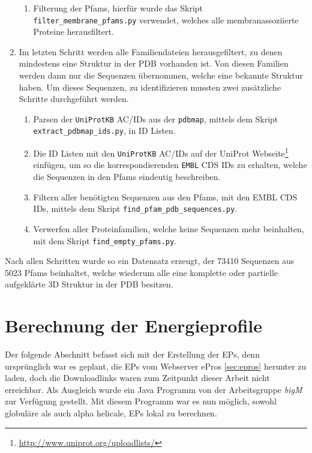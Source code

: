 \begin{enumerate}
\begin{enumerate}
        \item
        Filterung der \ac{Pfams}, hierfür wurde das Skript \texttt{filter\-\_membrane\-\_pfams.py} verwendet, welches alle membranassoziierte Proteine herausfiltert.
    \end{enumerate}
\item
    Im letzten Schritt werden alle Familiendateien herausgefiltert, zu denen mindestens eine Struktur in der \ac{PDB} vorhanden ist. Von diesen Familien werden dann nur die Sequenzen übernommen, welche eine bekannte Struktur haben. Um dieses Sequenzen, zu identifizieren mussten zwei zusätzliche Schritte durchgeführt werden.
    \begin{enumerate}
        \item
        Parsen der \texttt{UniProtKB} AC/IDs aus der \texttt{pdbmap}, mittels dem Skript \texttt{extract\_pdbmap\_ids.py}, in ID Listen.
        \item
        Die ID Listen mit den \texttt{UniProtKB} AC/IDs auf der UniProt Webseite\footnote{\url{http://www.uniprot.org/uploadlists/}} einfügen, um so die korrespondierenden \texttt{EMBL} CDS IDs zu erhalten, welche die Sequenzen in den Pfams eindeutig beschreiben.
        \item
        Filtern aller benötigten Sequenzen aus den Pfams, mit den EMBL CDS IDs, mittels dem Skript \texttt{find\-\_pfam\-\_pdb\-\_sequences.py}.
        \item
        Verwerfen aller Proteinfamilien, welche keine Sequenzen mehr beinhalten, mit dem Skript \texttt{find\-\_empty\-\_pfams.py}. 
    \end{enumerate}
\end{enumerate}

Nach allen Schritten wurde so ein Datensatz erzeugt, der 73410 Sequenzen aus 5023 \ac{Pfams} beinhaltet, welche wiederum alle eine komplette oder partielle aufgeklärte 3D Struktur in der \ac{PDB} besitzen.



\section{Berechnung der Energieprofile}
\label{sec:calc_ep}
Der folgende Abschnitt befasst sich mit der Erstellung der \ac{EP}s, denn ursprünglich war es geplant, die \ac{EP}s vom Webserver ePros \ref{sec:epros} herunter zu laden, doch die Downloadlinks waren zum Zeitpunkt dieser Arbeit nicht erreichbar. Als Ausgleich wurde ein Java Programm von der Arbeitsgruppe \emph{bigM} zur Verfügung gestellt. Mit diesem Programm war es nun möglich, sowohl globuläre als auch alpha helicale, \ac{EP}s lokal zu berechnen. 

